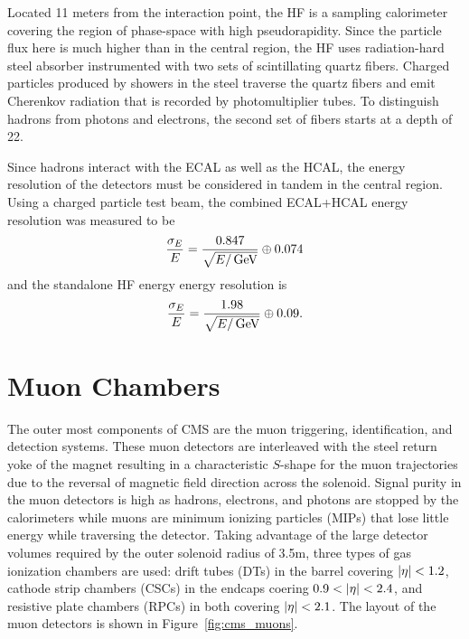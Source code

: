Located 11 meters from the interaction point, the HF is a sampling calorimeter covering the region of  phase-space with high pseudorapidity.
Since the particle flux here is much higher than in the central region, the HF uses radiation-hard steel absorber instrumented with two sets of scintillating quartz fibers.
Charged particles produced by showers in the steel traverse the quartz fibers and emit Cherenkov radiation that is recorded by photomultiplier tubes.
To distinguish hadrons from photons and electrons, the second set of fibers starts at a depth of 22\cm.

Since hadrons interact with the ECAL as well as the HCAL, the energy resolution of the detectors must be considered in tandem in the central region.
Using a charged particle test beam, the combined ECAL+HCAL energy resolution was measured to be
\begin{equation}
   \frac{\sigma_E}{E} = \frac{0.847}{\sqrt{E/\,\text{Ge\hspace{-.08em}V}}} \oplus 0.074
\end{equation}
and the standalone HF energy energy resolution is
\begin{equation}
   \frac{\sigma_E}{E} = \frac{1.98}{\sqrt{E/\,\text{Ge\hspace{-.08em}V}}} \oplus 0.09.
\end{equation}

\section{Muon Chambers}

The outer most components of CMS are the muon triggering, identification, and detection systems.
These muon detectors are interleaved with the steel return yoke of the magnet resulting in a characteristic $S$-shape for the muon trajectories due to the reversal of magnetic field direction across the solenoid.
Signal purity in the muon detectors is high as hadrons, electrons, and photons are stopped by the calorimeters while muons are minimum ionizing particles (MIPs) that lose little energy while traversing the detector.
Taking advantage of the large detector volumes required by the outer solenoid radius of 3.5\unit{m}, three types of gas ionization chambers are used: drift tubes (DTs) in the barrel covering $\lvert \eta \rvert < 1.2$, cathode strip chambers (CSCs) in the endcaps coering $0.9 < \lvert \eta \rvert < 2.4$, and resistive plate chambers (RPCs) in both covering $\lvert \eta \rvert < 2.1$.
The layout of the muon detectors is shown in Figure~\ref{fig:cms_muons}.

